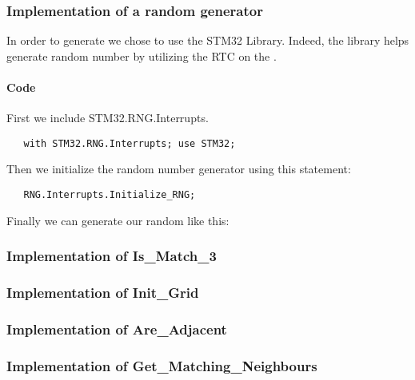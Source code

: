 \newpage

\subsubsection{Implementation of a random \sq generator}

In order to generate \sqs we chose to use the STM32 Library.
Indeed, the library helps generate random number by utilizing the RTC on the \stmdb.

\paragraph{Code}

\noindent
First we include STM32.RNG.Interrupts.
\begin{lstlisting}
   with STM32.RNG.Interrupts; use STM32;
\end{lstlisting}


\noindent
Then we initialize the random number generator using this statement:
\begin{lstlisting}
   RNG.Interrupts.Initialize_RNG;
\end{lstlisting}


\noindent
Finally we can generate our random \sqs like this:


\subsubsection{Implementation of Is\_Match\_3}


\newpage

\subsubsection{Implementation of Init\_Grid}


\newpage

\subsubsection{Implementation of Are\_Adjacent}


\subsubsection{Implementation of Get\_Matching\_Neighbours}


